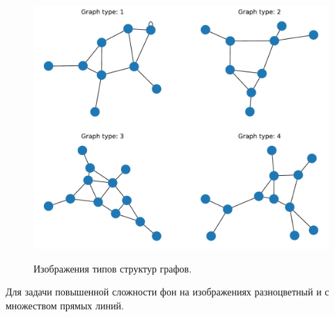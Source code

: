 \documentclass[10pt]{article}
\begin{document}
	\begin{figure}[h]
		\begin{center}
			{\includegraphics[width=0.68\linewidth]{data/graph_types.pdf}}
		\end{center}
		\caption{Изображения типов структур графов.}
		\label{ris:image2}
	\end{figure}
	
	Для задачи повышенной сложности фон на изображениях разноцветный и с множеством прямых линий.
	
\end{document}

